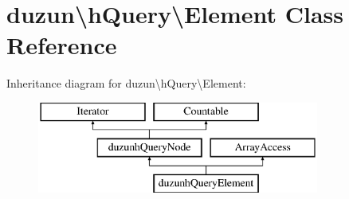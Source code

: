 \hypertarget{classduzun_1_1hQuery_1_1Element}{}\section{duzun\textbackslash{}h\+Query\textbackslash{}Element Class Reference}
\label{classduzun_1_1hQuery_1_1Element}
Inheritance diagram for duzun\textbackslash{}h\+Query\textbackslash{}Element\+:\begin{figure}[H]
\begin{center}
\leavevmode
\includegraphics[height=3.000000cm]{classduzun_1_1hQuery_1_1Element}
\end{center}
\end{figure}
